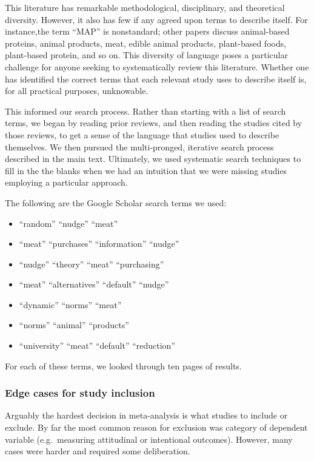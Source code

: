 \documentclass[sn-nature,referee,pdflatex]{sn-jnl}
\providecommand{\tightlist}{%
  \setlength{\itemsep}{0pt}\setlength{\parskip}{0pt}}
\begin{document}
This literature has remarkable methodological, disciplinary, and
theoretical diversity. However, it also has few if any agreed upon terms
to describe itself. For instance,the term ``MAP'' is nonstandard; other
papers discuss animal-based proteins, animal products, meat, edible
animal products, plant-based foods, plant-based protein, and so on. This
diversity of language poses a particular challenge for anyone seeking to
systematically review this literature. Whether one has identified the
correct terms that each relevant study uses to describe itself is, for
all practical purposes, unknowable.

This informed our search process. Rather than starting with a list of
search terms, we began by reading prior reviews, and then reading the
studies cited by those reviews, to get a sense of the language that
studies used to describe themselves. We then pursued the multi-pronged,
iterative search process described in the main text. Ultimately, we used
systematic search techniques to fill in the the blanks when we had an
intuition that we were missing studies employing a particular approach.

The following are the Google Scholar search terms we used:

\begin{itemize}
\tightlist
\item
  ``random'' ``nudge'' ``meat''
\item
  ``meat'' ``purchases'' ``information'' ``nudge''
\item
  ``nudge'' ``theory'' ``meat'' ``purchasing''
\item
  ``meat'' ``alternatives'' ``default'' ``nudge''
\item
  ``dynamic'' ``norms'' ``meat''
\item
  ``norms'' ``animal'' ``products''
\item
  ``university'' ``meat'' ``default'' ``reduction''
\end{itemize}

For each of these terms, we looked through ten pages of results.

\subsubsection{Edge cases for study inclusion}\label{sec5.4.2}

Arguably the hardest decision in meta-analysis is what studies to
include or exclude. By far the most common reason for exclusion was
category of dependent variable (e.g.~measuring attitudinal or
intentional outcomes). However, many cases were harder and required some
deliberation.
\end{document}
